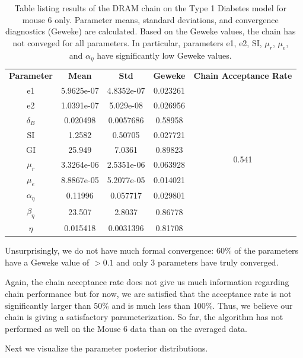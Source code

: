 \documentclass{article}
\begin{document}
\begin{table}[H]
\centering
        \begin{tabular}{c|c c c |c}
            \hline
            \textbf{Parameter} & \textbf{Mean} &  \textbf{Std} & \textbf{ Geweke} &\textbf{Chain Acceptance Rate}\\ 
            \cline{1-5}
            e1 & 5.9625e-07 & 4.8352e-07 & 0.023261 & \multirow{10}{*}{0.541} \\
            e2 & 1.0391e-07 &  5.029e-08 & 0.026956\\
            $\delta_B$ & 0.020498 &  0.0057686 & 0.58958\\
            SI &  1.2582   &  0.50705  & 0.027721\\
            GI &  25.949 &  7.0361 & 0.89823\\
            $\mu_r$ & 3.3264e-06 & 2.5351e-06  & 0.063928\\
            $\mu_e$ &  8.8867e-05 & 5.2077e-05 & 0.014021\\
            $\alpha_{\eta}$ & 0.11996 & 0.057717 & 0.029801\\
            $\beta_{\eta}$ &  23.507 & 2.8037  & 0.86778\\
            $\eta$ &  0.015418 &  0.0031396 & 0.81708
             \\\hline
                          \hline
        \end{tabular}
    \caption{Table listing results of the DRAM chain on the Type 1 Diabetes model for mouse 6 only. Parameter means, standard deviations, and convergence diagnostics (Geweke) are calculated. Based on the Geweke values, the chain has not conveged for all parameters. In particular, parameters e1, e2, SI, $\mu_r$, $\mu_e$, and $\alpha_\eta$ have significantly low Geweke values.}
    \label{tab:6mcmc}
\end{table}
Unsurprisingly, we do not have much formal convergence: 60\% of the parameters have a Geweke value of $> 0.1$ and only 3 parameters have truly converged.
\par Again, the chain acceptance rate does not give us much information regarding chain performance but for now, we are satisfied that the acceptance rate is not significantly larger than 50\% and is much less than 100\%. Thus, we believe our chain is giving a satisfactory parameterization. So far, the algorithm has not performed as well on the Mouse 6 data than on the averaged data.
\par Next we visualize the parameter posterior distributions.
\end{document}
